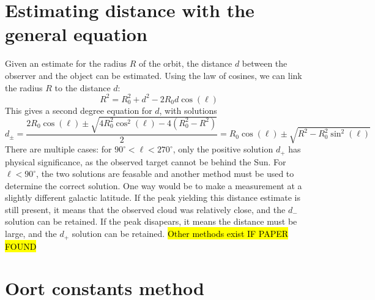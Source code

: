 \section{Estimating distance with the general equation}
\label{sec:distance_with_tangent_method}
Given an estimate for the radius $R$ of the orbit, the distance $d$ between the observer and the object can be estimated. Using the law of cosines, we can link the radius $R$ to the distance $d$:
\begin{equation}
    R^2 = R_0^2 + d^2 - 2 R_0 d \cos(\ell)
\end{equation}
This gives a second degree equation for $d$, with solutions
\begin{equation}
    d_\pm = \frac{2R_0 \cos(\ell) \pm \sqrt{4R_0^2 \cos^2(\ell) - 4(R_0^2 - R^2)}}{2} = R_0 \cos(\ell) \pm \sqrt{R^2 - R_0^2 \sin^2(\ell)}
\end{equation}
There are multiple cases: for $90^\circ < \ell < 270^\circ$, only the positive solution $d_+$ has physical significance, as the observed target cannot be behind the Sun. For $\ell < 90^\circ$, the two solutions are feasable and another method must be used to determine the correct solution. One way would be to make a measurement at a slightly different galactic latitude. If the peak yielding this distance estimate is still present, it means that the observed cloud was relatively close, and the $d_-$ solution can be retained. If the peak disapears, it means the distance must be large, and the $d_+$ solution can be retained. \hl{Other methods exist IF PAPER FOUND}

\section{Oort constants method}
\label{sec:oort_method}

